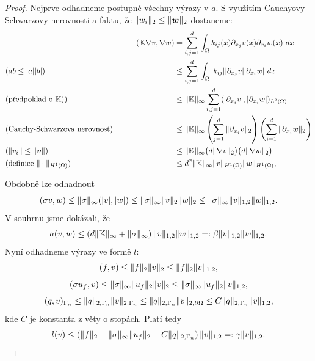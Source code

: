 \begin{proof}
    Nejprve odhadneme postupně všechny výrazy v $a$.
    S využitím Cauchyovy-Schwarzovy nerovnosti a faktu, že $\|w_i\|_2\le\|\mathbf{\boldsymbol{w}}\|_2$ dostaneme:
    \begin{align*}    
        &&({\mathbb{K}}\nabla v,\nabla w)
            & = \sum_{i,j=1}^d\int_\Omega k_{ij}(x)\partial_{x_j}v(x)\partial_{x_i}w(x)~dx\\
        &(\text{$ab\le |a||b|$})\qquad&
            &\le \sum_{i,j=1}^d\int_\Omega |k_{ij}||\partial_{x_j}v||\partial_{x_i}w|~dx\\
        &(\text{předpoklad o ${\mathbb{K}}$)})\qquad&
            &\le \|{\mathbb{K}}\|_\infty \sum_{i,j=1}^d ( |\partial_{x_j}v|, |\partial_{x_i}w| )_{L^2(\Omega)}\\
        &(\text{Cauchy-Schwarzova nerovnost})\qquad&
            &\le \|{\mathbb{K}}\|_\infty\left(\sum_{j=1}^d\|\partial_{x_j}v\|_2\right)\left(\sum_{i=1}^d\|\partial_{x_i}w\|_2\right)\\
        &(\text{$\|v_i\| \le \|\mathbf{\boldsymbol{v}}\|$})\qquad&
            &\le \|{\mathbb{K}}\|_\infty \big( d\|\nabla v\|_2\big) \big( d\|\nabla w\|_2\big)\\
        &(\text{definice $\|\cdot\|_{H^1(\Omega)}$})\qquad&
            &\le d^2\|{\mathbb{K}}\|_\infty\|v\|_{H^1(\Omega)} \|w\|_{H^1(\Omega)},
    \end{align*}
    
    
    Obdobně lze odhadnout
    \[ 
        (\sigma v,w)
        \le \|\sigma\|_\infty(|v|,|w|)
        \le \|\sigma\|_\infty\|v\|_2\|w\|_2
        \le \|\sigma\|_\infty\|v\|_{1,2}\|w\|_{1,2}. 
    \]
    V souhrnu jsme dokázali, že
    \[ 
        a(v,w) \le \left(d\|{\mathbb{K}}\|_\infty+\|\sigma\|_\infty\right)\|v\|_{1,2}\|w\|_{1,2} =: \beta \|v\|_{1,2}\|w\|_{1,2}. 
    \]
    Nyní odhadneme výrazy ve formě $l$:
    \[ 
        (f,v) \le \|f\|_2\|v\|_2 \le \|f\|_2\|v\|_{1,2}, 
    \]
    \[ 
        (\sigma u_f,v) \le \|\sigma\|_\infty\|u_f\|_2\|v\|_2 \le \|\sigma\|_\infty\|u_f\|_2\|v\|_{1,2}, 
    \]
    \[ 
        (q,v)_{\Gamma_n} \le \|q\|_{2,\Gamma_n}\|v\|_{2,\Gamma_n}
        \le \|q\|_{2,\Gamma_n}\|v\|_{2,\partial\Omega}
        \le C\|q\|_{2,\Gamma_n}\|v\|_{1,2}, 
    \]
    kde $C$ je konstanta z věty o stopách.
    Platí tedy
    \[ 
        l(v) \le \left(\|f\|_2+\|\sigma\|_\infty\|u_f\|_2+C\|q\|_{2,\Gamma_n}\right)\|v\|_{1,2} =:\gamma\|v\|_{1,2}. 
    \]
\end{proof}



